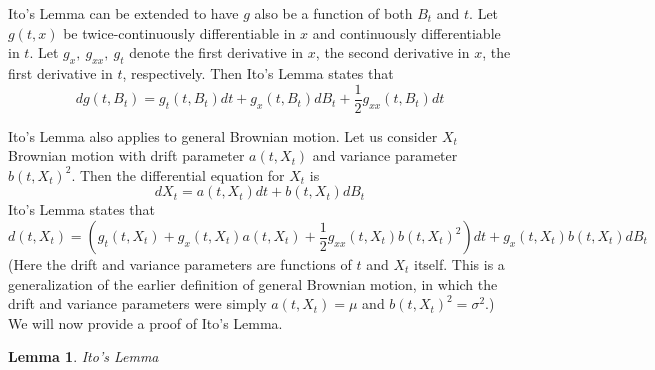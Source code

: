 \documentclass{article}
\newtheorem{lemma}[theorem]{Lemma}
\begin{document}
Ito's Lemma can be extended to have $g$ also be a function of both $B_t$ and $t$.  Let $g(t, x)$ be twice-continuously differentiable in $x$ and continuously differentiable in $t$.  Let $g_x,\ g_{xx},\ g_t$ denote the first derivative in $x$, the second derivative in $x$, the first derivative in $t$, respectively.  Then Ito's Lemma states that 
$$dg(t, B_t) = g_t(t,B_t)dt + g_x(t,B_t)dB_t + \frac12 g_{xx}(t,B_t)dt$$

Ito's Lemma also applies to general Brownian motion.  Let us consider $X_t$ Brownian motion with drift parameter $a(t,X_t)$ and variance parameter $b(t,X_t)^2$.  Then the differential equation for $X_t$ is 
$$dX_t = a(t,X_t)dt + b(t,X_t)dB_t$$
Ito's Lemma states that 
$$d(t,X_t) = \left( g_t(t,X_t) + g_x(t,X_t)a(t,X_t) + \frac12 g_{xx}(t,X_t)b(t,X_t)^2\right)dt + g_x(t,X_t)b(t,X_t)dB_t$$
(Here the drift and variance parameters are functions of $t$ and $X_t$ itself.  This is a generalization of the earlier definition of general Brownian motion, in which the drift and variance parameters were simply $a(t,X_t) = \mu$ and $b(t,X_t)^2 = \sigma^2$.)
\\

We will now provide a proof of Ito's Lemma.
\begin{lemma}
Ito's Lemma
\end{lemma}
\end{document}
